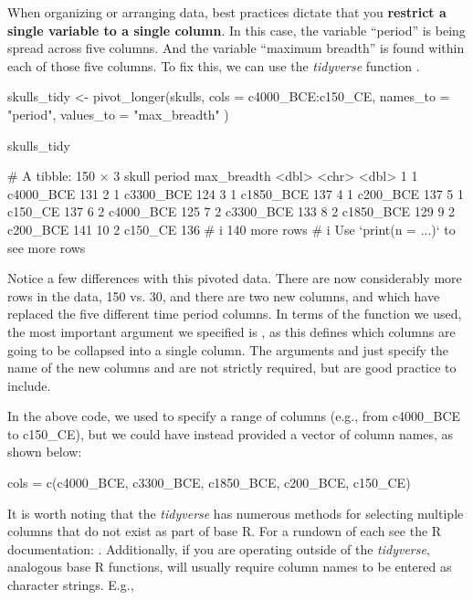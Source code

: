 When organizing or arranging data, best practices dictate that you \textbf{restrict a single variable to a single column}. In this case, the variable ``period'' is being spread across five columns. And the variable ``maximum breadth'' is found within each of those five columns. To fix this, we can use the \textit{tidyverse} function .

\begin{inR}
skulls_tidy <- pivot_longer(skulls,
  cols = c4000_BCE:c150_CE,
  names_to = "period",
  values_to = "max_breadth"
)

skulls_tidy
\end{inR}
\begin{outR}
# A tibble: 150 × 3
   skull period    max_breadth
   <dbl> <chr>           <dbl>
 1     1 c4000_BCE         131
 2     1 c3300_BCE         124
 3     1 c1850_BCE         137
 4     1 c200_BCE          137
 5     1 c150_CE           137
 6     2 c4000_BCE         125
 7     2 c3300_BCE         133
 8     2 c1850_BCE         129
 9     2 c200_BCE          141
10     2 c150_CE           136
# i 140 more rows
# i Use `print(n = ...)` to see more rows
\end{outR}

Notice a few differences with this pivoted data. There are now considerably more rows in the data, 150 vs. 30, and there are two new columns,  and  which have replaced the five different time period columns. In terms of the  function we used, the most important argument we specified is , as this defines which columns are going to be collapsed into a single column. The arguments  and  just specify the name of the new columns and are not strictly required, but are good practice to include.

In the above code, we used \R{:} to specify a range of columns (e.g., from c4000\_BCE to c150\_CE), but we could have instead provided a vector of column names, as shown below:

\begin{inR}
cols = c(c4000_BCE, c3300_BCE, c1850_BCE, c200_BCE, c150_CE)
\end{inR}
\vspace{1em}

\noindent It is worth noting that the \textit{tidyverse} has numerous methods for selecting multiple columns that do not exist as part of base R. For a rundown of each see the R documentation: . Additionally, if you are operating outside of the \textit{tidyverse}, analogous base R functions, will usually require column names to be entered as character strings. E.g.,

